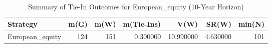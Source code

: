 \begin{table}
\caption{Summary of Tie-In Outcomes for European_equity (10-Year Horizon)}
\label{tab:tie_in_summary}
\begin{tabular}{lrrrrrr}
\toprule
Strategy & m(G) & m(W) & m(Tie-Ins) & V(W) & SR(W) & min(N) \\
\midrule
European_equity & 124 & 151 & 0.300000 & 10.990000 & 4.630000 & 101 \\
\bottomrule
\end{tabular}
\end{table}
